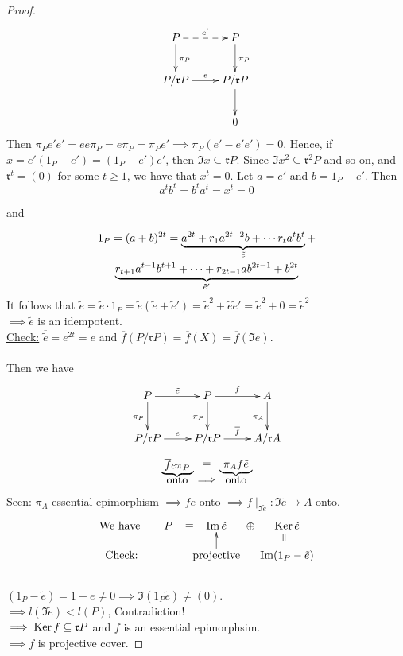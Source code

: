 \begin{thm}
\begin{proof}
\[
\xymatrix{
P\ar@{-->}[r]^{e'} \ar[d]^{\pi_P} & P \ar[d]^{\pi_P}\\
P/\mathfrak{r}P \ar[r]^e & P/\mathfrak{r}P \ar[d]\\
&0
}
\]
Then $\pi_P e'e' = ee\pi_P = e\pi_P = \pi_P e' \implies \pi_P(e'-e'e')
= 0$. Hence, if $x = e'(1_P - e') = (1_P-e')e'$, then $\Im x \subseteq
\mathfrak{r}P$. Since $\Im x^2 \subseteq \mathfrak{r}^2 P$ and so on,
and $\mathfrak{r}^t = (0)$ for some $t \geq 1$, we have that $x^t =
0$. Let $a = e'$ and $b = 1_P - e'$. Then $$a^tb^t = b^ta^t = x^t =
0$$ \centerline{and}
\begin{multline}
1_P = (a+b)^{2t} = \underbrace{a^{2t} + r_1a^{2t-2}b + \cdots
  r_ta^tb^t}_{\tilde{e}} +\notag\\
 \underbrace{r_{t+1}a^{t-1}b^{t+1} + \cdots + r_{2t-1}ab^{2t-1} +
   b^{2t}}_{\tilde{e}'}
\end{multline}
It follows that $\tilde{e} = \tilde{e}\cdot 1_P = \tilde{e}(\tilde{e} + \tilde{e}') = \tilde{e}^2 + \tilde{e}\tilde{e}' = \tilde{e}^2 + 0 = \tilde{e}^2$\\
$\implies \tilde{e}$ is an idempotent.\\
\underline{Check:} $\overline{\tilde{e}} = e^{2t} = e$ and $\overline{f}(P/\mathfrak{r}P) = \overline{f}(X) = \overline{f}(\Im e)$.\\
\leavevmode\\
Then we have 
\[
\xymatrix{
P \ar[r]^{\tilde{e}} \ar[d]_{\pi_P} & P \ar[r]^{f} \ar[d]_{\pi_P} & A \ar[d]_{\pi_A}\\
P/\mathfrak{r}P \ar[r]^e & P/\mathfrak{r}P \ar[r]^{\overline{f}} & A/\mathfrak{r}A
}
\]
\[\xymatrix@R-2pc{
*+[F_\}]{\overline{f}e \pi_P} \ar@{}[r]|-*[@]{=} & *+[F_\}]{\pi_A f \tilde{e}}\\
\text{onto} \ar@{}[r]|-*[@]{\implies} & \text{onto} 
}\]
\underline{Seen:} $\pi_A$ essential epimorphism $\implies f \tilde{e}$ onto $\implies f \mid_{\Im \tilde{e}}\colon  \Im \tilde{e} \to A$ onto.\\

$$\xymatrix@R-1pc@C-1pc{
\text{We have } & P \ar@{}[r]|-*[@]{=} & \Im \tilde{e} \ar@{}[r]|-*[@]{\oplus} & \Ker \tilde{e}\\
\text{Check:} && \text{projective} \ar[u] & \Im(1_P - \tilde{e}) \ar@{}[u]|-*[@]{=}
}$$\\
$\overline{(1_P - \tilde{e})} = 1 - e \neq 0 \implies \Im (1_P \tilde{e}) \neq (0)$.\\
$\implies l(\Im \tilde{e}) < l(P)$, Contradiction!\\
$\implies \operatorname{Ker}\nolimits f \subseteq \mathfrak{r}P$ and $f$ is an essential epimorphsim.\\
$\implies f$ is projective cover.


\end{proof}
\end{thm}

